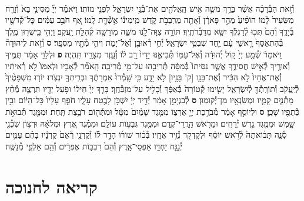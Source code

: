 \documentclass[twoside, openany, parskip=half, 11pt]{book}
\begin{document}
\begin{footnotesize}
\begin{multicols}{2}
\\
וְ֯זֹ֣את הַבְּ֯רָכָ֗ה אֲשֶׁ֨ר בֵּרַ֥ךְ מֹשֶׁ֛ה אִ֥ישׁ הָֽאֱלֹהִ֖ים אֶת־בְּ֯נֵ֣י יִשְׂרָאֵ֑ל לִפְנֵ֖י מוֹתֽוֹ׃ וַיֹּאמַ֗ר יְיָ֞ מִסִּינַ֥י בָּא֙ וְ֯זָרַ֤ח מִשֵּׂעִיר֙ לָ֔מוֹ הוֹפִ֨יעַ֙ מֵהַ֣ר פָּארָ֔ן וְ֯אָתָ֖ה מֵרִֽבְבֹ֣ת קֹ֑דֶשׁ מִֽימִינ֕וֹ אֵ֥שְׁ֯דָּ֖ת לָֽמוֹ׃ אַ֚ף חֹבֵ֣ב עַמִּ֔ים כׇּל־קְ֯דֹשָׁ֖יו בְּ֯יָדֶ֑ךָ וְ֯הֵם֙ תֻּכּ֣וּ לְ֯רַגְלֶ֔ךָ יִשָּׂ֖א מִדַּבְּ֯רֹתֶֽיךָ׃ תּוֹרָ֥ה צִוָּה־לָ֖נוּ מֹשֶׁ֑ה מֽוֹרָשָׁ֖ה קְ֯הִלַּ֥ת יַֽעֲקֹֽב׃ וַיְהִ֥י בִֽישֻׁר֖וּן מֶ֑לֶךְ בְּ֯הִתְאַסֵּף֙ רָ֣אשֵׁי עָ֔ם יַ֖חַד שִׁבְטֵ֥י יִשְׂרָאֵֽל׃ יְ֯חִ֥י רְ֯אוּבֵ֖ן וְ֯אַל־יָמֹ֑ת וִיהִ֥י מְ֯תָ֖יו מִסְפָּֽר׃ \textbf{ס} וְ֯זֹ֣את לִֽיהוּדָה֘ וַיֹּאמַר֒ שְׁ֯מַ֤ע יְיָ֙ ק֣וֹל יְ֯הוּדָ֔ה וְ֯אֶל־עַמּ֖וֹ תְּ֯בִיאֶ֑נּוּ יָדָיו֙ רָ֣ב ל֔וֹ וְ֯עֵ֥זֶר מִצָּרָ֖יו תִּֽהְיֶה׃ \textbf{פ}
וּלְלֵוִ֣י אָמַ֔ר תֻּמֶּ֥יךָ וְ֯אוּרֶ֖יךָ לְ֯אִ֣ישׁ חֲסִידֶ֑ךָ אֲשֶׁ֤ר נִסִּיתוֹ֙ בְּ֯מַסָּ֔ה תְּ֯רִיבֵ֖הוּ עַל־מֵ֥י מְ֯רִיבָֽה׃ הָֽאֹמֵ֞ר לְ֯אָבִ֤יו וּלְאִמּוֹ֙ לֹ֣א רְ֯אִיתִ֔יו וְ֯אֶת־אֶחָיו֙ לֹ֣א הִכִּ֔יר וְ֯אֶת־בָּנָ֖ו [ק' בָּנָ֖יו] לֹ֣א יָדָ֑ע כִּ֤י שָֽׁמְ֯רוּ֙ אִמְרָתֶ֔ךָ וּבְרִֽיתְךָ֖ יִנְצֹֽרוּ׃ יוֹר֤וּ מִשְׁפָּטֶ֨יךָ֙ לְ֯יַֽעֲקֹ֔ב וְ֯תוֹרָֽתְ֯ךָ֖ לְ֯יִשְׂרָאֵ֑ל יָשִׂ֤ימוּ קְ֯טוֹרָה֙ בְּ֯אַפֶּ֔ךָ וְ֯כָלִ֖יל עַל־מִזְבְּ֯חֶֽךָ׃ בָּרֵ֤ךְ יְיָ֙ חֵיל֔וֹ וּפֹ֥עַל יָדָ֖יו תִּרְצֶ֑ה מְ֯חַ֨ץ מָתְ֯נַ֧יִם קָמָ֛יו וּמְשַׂנְאָ֖יו מִן־יְ֯קוּמֽוּן׃ \textbf{ס} לְ֯בִנְיָמִ֣ן אָמַ֔ר יְ֯דִ֣יד יְיָ֔ יִשְׁכֹּ֥ן לָבֶ֖טַח עָלָ֑יו חֹפֵ֤ף עָלָיו֙ כׇּל־הַיּ֔וֹם וּבֵ֥ין כְּ֯תֵפָ֖יו שָׁכֵֽן׃ \textbf{ס}
וּלְיוֹסֵ֣ף אָמַ֔ר מְ֯בֹרֶ֥כֶת יְיָ֖ אַרְצ֑וֹ מִמֶּ֤גֶד שָׁמַ֨יִם֙ מִטָּ֔ל וּמִתְּ֯ה֖וֹם רֹבֶ֥צֶת תָּֽחַת׃ וּמִמֶּ֖גֶד תְּ֯בוּאֹ֣ת שָׁ֑מֶשׁ וּמִמֶּ֖גֶד גֶּ֥רֶשׁ יְ֯רָחִֽים׃ וּמֵרֹ֖אשׁ הַֽרֲרֵי־קֶ֑דֶם וּמִמֶּ֖גֶד גִּבְע֥וֹת עוֹלָֽם׃ וּמִמֶּ֗גֶד אֶ֚רֶץ וּמְלֹאָ֔הּ וּרְצ֥וֹן שֹֽׁכְ֯נִ֖י סְ֯נֶ֑ה תָּב֨וֹאתָה֙ לְ֯רֹ֣אשׁ יוֹסֵ֔ף וּלְקָדְקֹ֖ד נְ֯זִ֥יר אֶחָֽיו׃ בְּ֯כ֨וֹר שׁוֹר֜וֹ הָדָ֣ר ל֗וֹ וְ֯קַרְנֵ֤י רְ֯אֵם֙ קַרְנָ֔יו בָּהֶ֗ם עַמִּ֛ים יְ֯נַגַּ֥ח יַחְדָּ֖ו אַפְסֵי־אָ֑רֶץ וְ֯הֵם֙ רִבְב֣וֹת אֶפְרַ֔יִם וְ֯הֵ֖ם אַלְפֵ֥י מְ֯נַשֶּֽׁה׃

\end{multicols}


\newcommand{\tsource}[1]{\begin{scriptsize} \textsf{(#1)} \end{scriptsize}}
\section[חנוכה]{קריאה לחנוכה}


\end{footnotesize}
\end{document}
